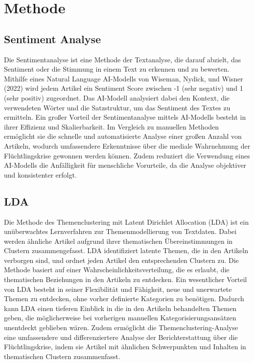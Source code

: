 \documentclass[
  11pt,
]{article}
\begin{document}
\hypertarget{methode}{%
\section{Methode}\label{methode}}

\hypertarget{sentiment-analyse}{%
\subsection{Sentiment Analyse}\label{sentiment-analyse}}

Die Sentimentanalyse ist eine Methode der Textanalyse, die darauf
abzielt, das Sentiment oder die Stimmung in einem Text zu erkennen und
zu bewerten. Mithilfe eines Natural Language AI-Modells von Wiseman,
Nydick, und Wisner (2022) wird jedem Artikel ein Sentiment Score
zwischen -1 (sehr negativ) und 1 (sehr positiv) zugeordnet. Das
AI-Modell analysiert dabei den Kontext, die verwendeten Wörter und die
Satzstruktur, um das Sentiment des Textes zu ermitteln. Ein großer
Vorteil der Sentimentanalyse mittels AI-Modells besteht in ihrer
Effizienz und Skalierbarkeit. Im Vergleich zu manuellen Methoden
ermöglicht sie die schnelle und automatisierte Analyse einer großen
Anzahl von Artikeln, wodurch umfassendere Erkenntnisse über die mediale
Wahrnehmung der Flüchtlingskrise gewonnen werden können. Zudem reduziert
die Verwendung eines AI-Modells die Anfälligkeit für menschliche
Vorurteile, da die Analyse objektiver und konsistenter erfolgt.

\hypertarget{lda}{%
\subsection{LDA}\label{lda}}

Die Methode des Themenclustering mit Latent Dirichlet Allocation (LDA)
ist ein unüberwachtes Lernverfahren zur Themenmodellierung von
Textdaten. Dabei werden ähnliche Artikel aufgrund ihrer thematischen
Übereinstimmungen in Clustern zusammengefasst. LDA identifiziert latente
Themen, die in den Artikeln verborgen sind, und ordnet jeden Artikel den
entsprechenden Clustern zu. Die Methode basiert auf einer
Wahrscheinlichkeitsverteilung, die es erlaubt, die thematischen
Beziehungen in den Artikeln zu entdecken. Ein wesentlicher Vorteil von
LDA besteht in seiner Flexibilität und Fähigkeit, neue und unerwartete
Themen zu entdecken, ohne vorher definierte Kategorien zu benötigen.
Dadurch kann LDA einen tieferen Einblick in die in den Artikeln
behandelten Themen geben, die möglicherweise bei vorherigen manuellen
Kategorisierungsansätzen unentdeckt geblieben wären. Zudem ermöglicht
die Themenclustering-Analyse eine umfassendere und differenziertere
Analyse der Berichterstattung über die Flüchtlingskrise, indem sie
Artikel mit ähnlichen Schwerpunkten und Inhalten in thematischen
Clustern zusammenfasst.
\end{document}
